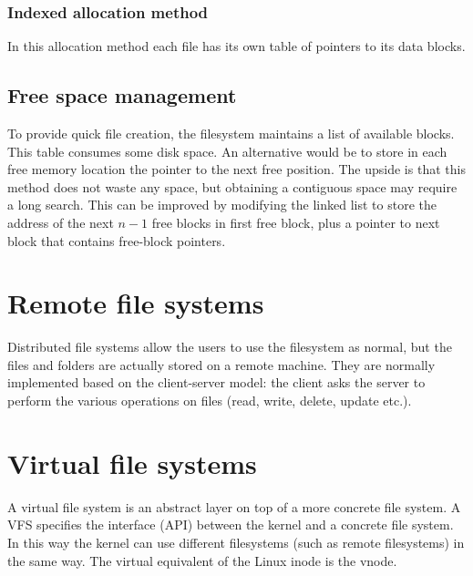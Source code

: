 \subsubsection{Indexed allocation method}
In this allocation method each file has its own table of pointers to its data blocks.


\subsection{Free space management}
To provide quick file creation, the filesystem maintains a list of available blocks. This table consumes some disk space. An alternative would be to store in each free memory location the pointer to the next free position. The  upside is that this method does not waste any space, but obtaining a contiguous space may require a long search. This can be improved by modifying the linked list to store the address of the next $n-1$ free blocks in first free block, plus a pointer to next block that contains free-block pointers.


\section{Remote file systems}
Distributed file systems allow the users to use the filesystem as normal, but the files and folders are actually stored on a remote machine. They are normally implemented based on the client-server model: the client asks the server to perform the various operations on files (read, write, delete, update etc.).

\section{Virtual file systems}
A virtual file system is an abstract layer on top of a more concrete file system. A VFS specifies the interface (API) between the kernel and a concrete file system. In this way the kernel can use different filesystems (such as remote filesystems) in the same way. The virtual equivalent of the Linux inode is the vnode.


